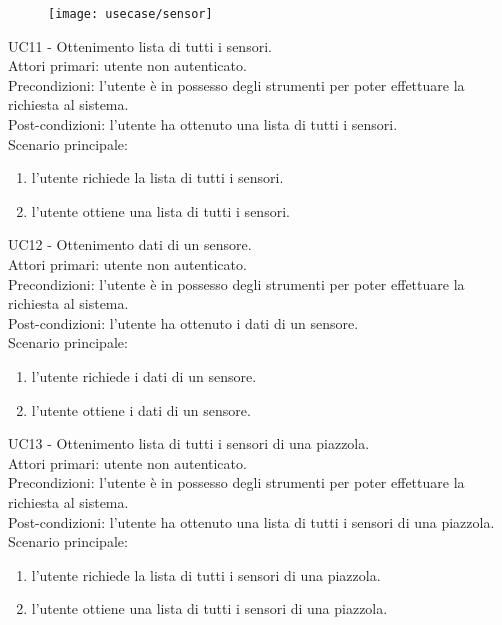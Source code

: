 \leavevmode\newline
\begin{figure}[!h]
    \centering
    \texttt{[image: usecase/sensor]}
\end{figure}
UC11 - Ottenimento lista di tutti i sensori.
\\
Attori primari: utente non autenticato.
\\
Precondizioni: l'utente è in possesso degli strumenti per poter effettuare la richiesta al sistema.
\\
Post-condizioni: l'utente ha ottenuto una lista di tutti i sensori.
\\
Scenario principale:
\begin{enumerate}
    \item l'utente richiede la lista di tutti i sensori.
    \item l'utente ottiene una lista di tutti i sensori.
\end{enumerate}
\leavevmode\newline
UC12 - Ottenimento dati di un sensore.
\\
Attori primari: utente non autenticato.
\\
Precondizioni: l'utente è in possesso degli strumenti per poter effettuare la richiesta al sistema.
\\
Post-condizioni: l'utente ha ottenuto i dati di un sensore.
\\
Scenario principale:
\begin{enumerate}
    \item l'utente richiede i dati di un sensore.
    \item l'utente ottiene i dati di un sensore.
\end{enumerate}
\leavevmode\newline
UC13 - Ottenimento lista di tutti i sensori di una piazzola.
\\
Attori primari: utente non autenticato.
\\
Precondizioni: l'utente è in possesso degli strumenti per poter effettuare la richiesta al sistema.
\\
Post-condizioni: l'utente ha ottenuto una lista di tutti i sensori di una piazzola.
\\
Scenario principale:
\begin{enumerate}
    \item l'utente richiede la lista di tutti i sensori di una piazzola.
    \item l'utente ottiene una lista di tutti i sensori di una piazzola.
\end{enumerate}
